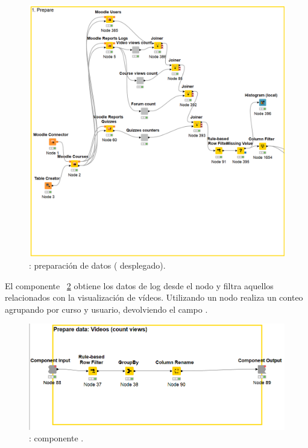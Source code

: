 \begin{figure}[!htb]
	\centering
	\includegraphics[width=1\textwidth]{img/workflow1.png}
	\caption{: preparación de datos ( desplegado).}
	\label{fig:workflow1}
\end{figure}
\FloatBarrier

El componente  ~\ref{fig:workflow1a} obtiene los datos de log desde el nodo  y filtra aquellos
 relacionados con la visualización de vídeos. Utilizando un nodo  realiza un conteo agrupando por curso y usuario, devolviendo el campo .

\begin{figure}[!htb]
	\centering
	\includegraphics[width=1\textwidth]{img/workflow1a.png}
	\caption{: componente .}
	\label{fig:workflow1a}
\end{figure}
\FloatBarrier

